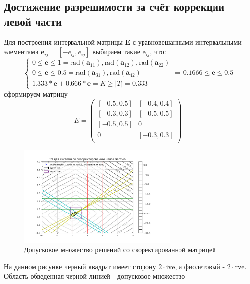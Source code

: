 \documentclass[a4paper,14pt]{article}
\begin{document}
	\subsection{Достижение разрешимости за счёт коррекции левой части}
	Для построения интервальной матрицы $\textbf{E}$ с уравновешанными интервальными элементами $\mathbf{e}_{ij}=[-e_{ij}, e_{ij}]$ выбираем такие $\mathbf{e}_{ij}$, что:
	\begin{equation*}
		\begin{cases}
			0 \leq \mathbf{e} \leq 1 = \mathrm{rad}(\textbf{a}_{11}), \mathrm{rad}(\textbf{a}_{12}), \mathrm{rad}(\textbf{a}_{22}) \\
			0 \leq \mathbf{e} \leq 0.5 = \mathrm{rad}(\textbf{a}_{31}), \mathrm{rad}(\textbf{a}_{42}) \\
			1.333*\mathbf{e} + 0.666*\mathbf{e} = K \geq |T| = 0.333
		\end{cases}
		\Rightarrow 0.1666 \leq \mathbf{e} \leq 0.5
	\end{equation*}
	сформируем матрицу 
	\begin{equation}
		{E}=
		\begin{pmatrix}
			[-0.5, 0.5] & [-0.4, 0.4] \\
			[-0.3, 0.3] & [-0.5, 0.5] \\
			[-0.5, 0.5] & 0 \\
			0 & [-0.3, 0.3] \\
		\end{pmatrix}
	\end{equation}
	\begin{figure}[H] \label{MatrixCorrSet}
		\centering
		\includegraphics[width=0.7\textwidth]{../src/pic/left.png}
		\caption{Допусковое множество решений со скоректированной матрицей} 
	\end{figure}
	\noindent На данном рисунке черный квадрат имеет сторону $2\cdot \mathrm{ive}$, а фиолетовый - $2\cdot \mathrm{rve}. $ Область обведенная черной линией - допусковое множество\\
\end{document}
